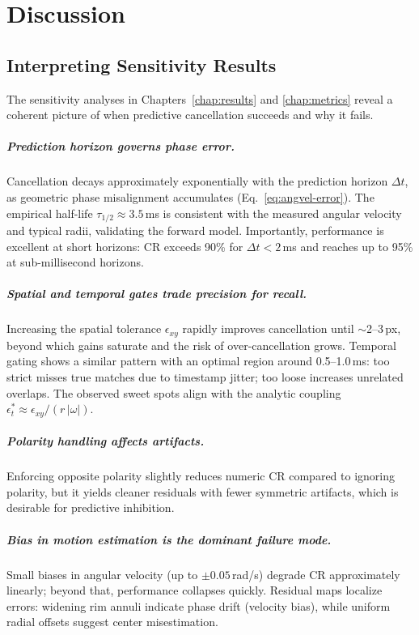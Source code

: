 \chapter{Discussion}\label{chap:discussion}

\section{Interpreting Sensitivity Results}
The sensitivity analyses in Chapters~\ref{chap:results} and \ref{chap:metrics} reveal a coherent picture of when predictive cancellation succeeds and why it fails.

\paragraph{Prediction horizon governs phase error.} Cancellation decays approximately exponentially with the prediction horizon $\Delta t$, as geometric phase misalignment accumulates (Eq.~\eqref{eq:angvel-error}). The empirical half-life $\tau_{1/2} \approx 3.5$\,ms is consistent with the measured angular velocity and typical radii, validating the forward model. Importantly, performance is excellent at short horizons: CR exceeds 90\% for $\Delta t<2$\,ms and reaches up to 95\% at sub-millisecond horizons.

\paragraph{Spatial and temporal gates trade precision for recall.} Increasing the spatial tolerance $\epsilon_{xy}$ rapidly improves cancellation until $\sim$2--3\,px, beyond which gains saturate and the risk of over-cancellation grows. Temporal gating shows a similar pattern with an optimal region around 0.5--1.0\,ms: too strict misses true matches due to timestamp jitter; too loose increases unrelated overlaps. The observed sweet spots align with the analytic coupling $\epsilon_t^{*} \approx \epsilon_{xy}/(r\,|\omega|)$.

\paragraph{Polarity handling affects artifacts.} Enforcing opposite polarity slightly reduces numeric CR compared to ignoring polarity, but it yields cleaner residuals with fewer symmetric artifacts, which is desirable for predictive inhibition.

\paragraph{Bias in motion estimation is the dominant failure mode.} Small biases in angular velocity (up to $\pm0.05$\,rad/s) degrade CR approximately linearly; beyond that, performance collapses quickly. Residual maps localize errors: widening rim annuli indicate phase drift (velocity bias), while uniform radial offsets suggest center misestimation.


